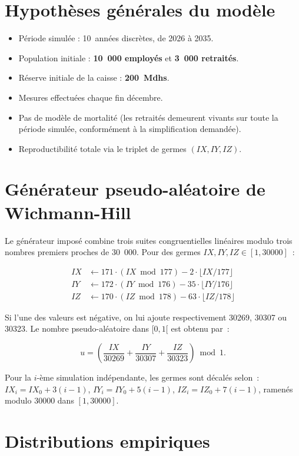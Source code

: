 \documentclass[12pt,a4paper,oneside]{report}
\begin{document}
\section{Hypothèses générales du modèle}

\begin{itemize}
  \item Période simulée : 10~années discrètes, de 2026 à 2035.
  \item Population initiale : \textbf{10~000 employés} et
        \textbf{3~000 retraités}.
  \item Réserve initiale de la caisse : \textbf{200~Mdhs}.
  \item Mesures effectuées chaque fin décembre.
  \item Pas de modèle de mortalité (les retraités demeurent vivants sur
        toute la période simulée, conformément à la simplification
        demandée).
  \item Reproductibilité totale via le triplet de germes
        $(IX, IY, IZ)$.
\end{itemize}

\section{Générateur pseudo-aléatoire de Wichmann-Hill}

Le générateur imposé combine trois suites congruentielles linéaires
modulo trois nombres premiers proches de 30~000. Pour des germes
$IX, IY, IZ \in [1, 30000]$~:

\begin{align*}
IX &\gets 171 \cdot (IX \bmod 177) - 2  \cdot \lfloor IX/177 \rfloor \\
IY &\gets 172 \cdot (IY \bmod 176) - 35 \cdot \lfloor IY/176 \rfloor \\
IZ &\gets 170 \cdot (IZ \bmod 178) - 63 \cdot \lfloor IZ/178 \rfloor
\end{align*}

Si l'une des valeurs est négative, on lui ajoute respectivement
30269, 30307 ou 30323. Le nombre pseudo-aléatoire dans $[0, 1[$ est
obtenu par~:

\[
u = \left( \frac{IX}{30269} + \frac{IY}{30307} + \frac{IZ}{30323} \right)
    \bmod 1.
\]

Pour la $i$-ème simulation indépendante, les germes sont décalés selon~:
$IX_i = IX_0 + 3(i-1)$, $IY_i = IY_0 + 5(i-1)$, $IZ_i = IZ_0 + 7(i-1)$,
ramenés modulo 30000 dans $[1, 30000]$.

\section{Distributions empiriques}
\end{document}
